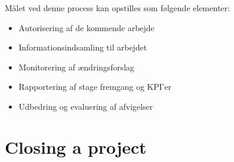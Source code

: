Målet ved denne process kan opstilles som følgende elementer:

\begin{itemize}
    \item Autorisering af de kommende arbejde
    \item Informationsindsamling til arbejdet
    \item Monitorering af ændringsforslag
    \item Rapportering af stage fremgang og KPI'er
    \item Udbedring og evaluering af afvigelser
\end{itemize}


\section{Closing a project}
